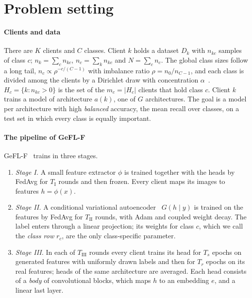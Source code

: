\section{Problem setting}\label{sec:setting}

\paragraph{Clients and data} There are $K$ clients and $C$ classes. Client $k$ holds a dataset $D_k$ with $n_{kc}$
samples of class $c$; $n_k=\sum_c n_{kc}$, $n_c=\sum_k n_{kc}$ and $N=\sum_c n_c$. The global class sizes follow a
long tail, $n_c\propto \rho^{-c/(C-1)}$ with imbalance ratio $\rho=n_0/n_{C-1}$, and each class is divided among
the clients by a Dirichlet draw with concentration $\alpha$~\cite{hsu2019dirichlet}. $H_c=\{k: n_{kc}>0\}$ is the
set of the $m_c=|H_c|$ clients that hold class $c$. Client $k$ trains a model of architecture $a(k)$, one of $G$
architectures. The goal is a model per architecture with high \emph{balanced} accuracy, the mean recall over classes,
on a test set in which every class is equally important.

\paragraph{The pipeline of GeFL-F} GeFL-F~\cite{kang2025gefl} trains in three stages.
\begin{enumerate}
\item \emph{Stage I.} A small feature extractor $\phi$ is trained together with the heads by FedAvg for
$T_{\mathrm{I}}$ rounds and then frozen.
Every client maps its images to features $h=\phi(x)$.
\item \emph{Stage II.} A conditional variational autoencoder~\cite{sohn2015cvae} $G(h\mid y)$ is trained on the
features by FedAvg for $T_{\mathrm{II}}$ rounds, with Adam and coupled weight decay. The label enters through a linear
projection; its weights for class $c$, which we call the \emph{class row} $r_c$, are the only class-specific
parameter.
\item \emph{Stage III.} In each of $T_{\mathrm{III}}$ rounds every client trains its head for $T_s$ epochs on
generated features with uniformly drawn labels and then for $T_r$ epochs on its real features; heads of the same
architecture are averaged. Each head consists of a \emph{body} of convolutional blocks, which maps $h$ to an
embedding $e$, and a linear last layer.
\end{enumerate}

